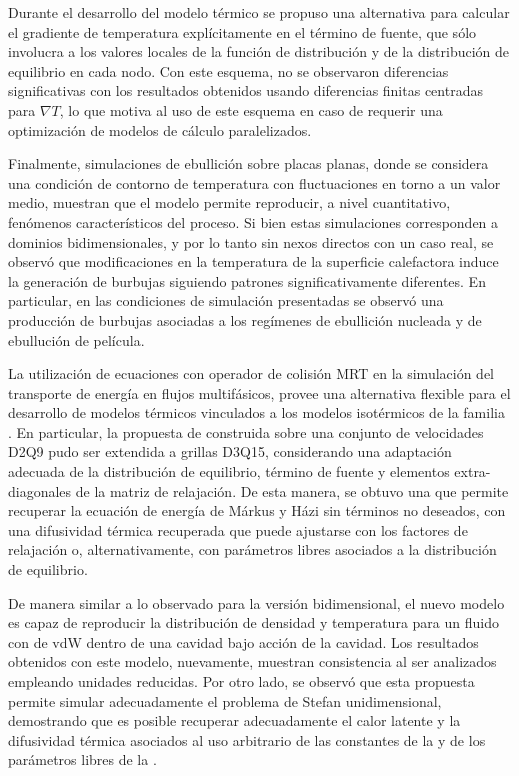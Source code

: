 Durante el desarrollo del modelo t\'ermico se propuso una alternativa para calcular el gradiente de temperatura expl\'icitamente en el t\'ermino de fuente, que s\'olo involucra a los valores locales de la funci\'on de distribuci\'on y de la distribuci\'on de equilibrio en cada nodo. Con este esquema, no se observaron diferencias significativas con los resultados obtenidos usando diferencias finitas centradas para $\nabla T$, lo que motiva al uso de este esquema en caso de requerir una optimizaci\'on de modelos de c\'alculo paralelizados.

Finalmente, simulaciones de ebullici\'on sobre placas planas, donde se considera una condici\'on de contorno de temperatura con fluctuaciones en torno a un valor medio, muestran que el modelo permite reproducir, a nivel cuantitativo, fen\'omenos caracter\'isticos del proceso. Si bien estas simulaciones corresponden a dominios bidimensionales, y por lo tanto sin nexos directos con un caso real, se observ\'o que modificaciones en la temperatura de la superficie calefactora induce la generaci\'on de burbujas siguiendo patrones significativamente diferentes. En particular, en las condiciones de simulaci\'on presentadas se observ\'o una producci\'on de burbujas asociadas a los reg\'imenes de ebullici\'on nucleada y de ebulluci\'on de pel\'icula. 


\bigskip

La utilizaci\'on de ecuaciones con operador de colisi\'on MRT en la simulaci\'on del transporte de energ\'ia en flujos multif\'asicos, provee una alternativa flexible para el desarrollo de modelos t\'ermicos vinculados a los modelos isot\'ermicos de la familia \pp{}. En particular, la propuesta de \lbe{} construida sobre una conjunto de velocidades D2Q9 pudo ser extendida a grillas D3Q15, considerando una adaptaci\'on adecuada de la distribuci\'on de equilibrio, t\'ermino de fuente y elementos extra-diagonales de la matriz de relajaci\'on. De esta manera, se obtuvo una \lbe{} que permite recuperar la ecuaci\'on de energ\'ia de M\'arkus y H\'azi sin t\'erminos no deseados, con una difusividad t\'ermica recuperada que puede ajustarse con los factores de relajaci\'on o, alternativamente, con par\'ametros libres asociados a la distribuci\'on de equilibrio.

De manera similar a lo observado para la versi\'on bidimensional, el nuevo modelo es capaz de reproducir la distribuci\'on de densidad y temperatura para un fluido con \eos{} de vdW dentro de una cavidad bajo acci\'on de la cavidad. Los resultados obtenidos con este modelo, nuevamente, muestran consistencia al ser analizados empleando unidades reducidas. Por otro lado, se observ\'o que esta propuesta permite simular adecuadamente el problema de Stefan unidimensional, demostrando que es posible recuperar adecuadamente el calor latente y la difusividad t\'ermica asociados al uso arbitrario de las constantes de la \eos{} y de los par\'ametros libres de la \edf{}.

